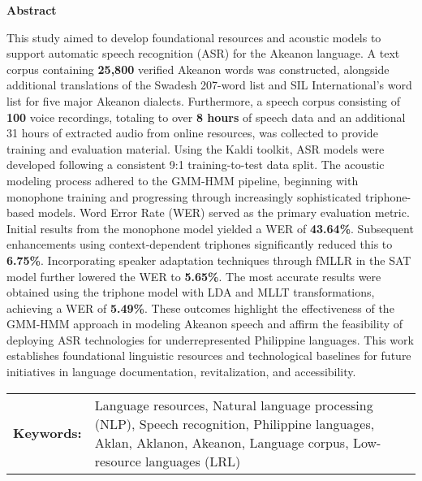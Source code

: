\begin{center}
\textbf{Abstract}
\end{center}
\setlength{\parindent}{0pt}
This study aimed to develop foundational resources and acoustic models to support automatic speech recognition (ASR) for the Akeanon language. A text corpus containing \textbf{25,800} verified Akeanon words was constructed, alongside additional translations of the Swadesh 207-word list and SIL International's word list for five major Akeanon dialects. Furthermore, a speech corpus consisting of \textbf{100} voice recordings, totaling to over \textbf{8 hours} of speech data and an additional 31 hours of extracted audio from online resources, was collected to provide training and evaluation material. Using the Kaldi toolkit, ASR models were developed following a consistent 9:1 training-to-test data split. The acoustic modeling process adhered to the GMM-HMM pipeline, beginning with monophone training and progressing through increasingly sophisticated triphone-based models. Word Error Rate (WER) served as the primary evaluation metric. Initial results from the monophone model yielded a WER of \textbf{43.64\%}. Subsequent enhancements using context-dependent triphones significantly reduced this to \textbf{6.75\%}. Incorporating speaker adaptation techniques through fMLLR in the SAT model further lowered the WER to \textbf{5.65\%}. The most accurate results were obtained using the triphone model with LDA and MLLT transformations, achieving a WER of \textbf{5.49\%}. These outcomes highlight the effectiveness of the GMM-HMM approach in modeling Akeanon speech and affirm the feasibility of deploying ASR technologies for underrepresented Philippine languages. This work establishes foundational linguistic resources and technological baselines for future initiatives in language documentation, revitalization, and accessibility.


\begin{tabular}{lp{4.25in}}
\hspace{-0.5em}\textbf{Keywords:}\hspace{0.25em} & Language resources, Natural language processing (NLP), Speech recognition, Philippine languages, Aklan, Aklanon, Akeanon, Language corpus, Low-resource languages (LRL)\\
\end{tabular}
